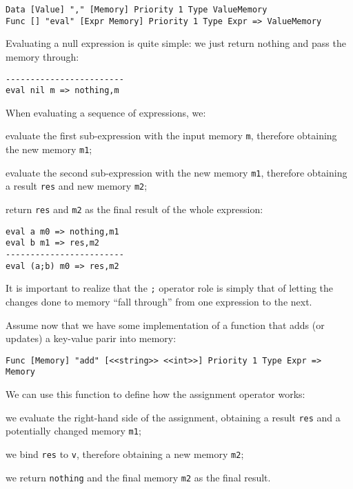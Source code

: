 \begin{lstlisting}
Data [Value] "," [Memory] Priority 1 Type ValueMemory
Func [] "eval" [Expr Memory] Priority 1 Type Expr => ValueMemory
\end{lstlisting}

Evaluating a null expression is quite simple: we just return nothing and pass the memory through:

\begin{lstlisting}
------------------------
eval nil m => nothing,m
\end{lstlisting}

When evaluating a sequence of expressions, we:
\begin{inparaenum}
\item evaluate the first sub-expression with the input memory \texttt{m}, therefore obtaining the new memory \texttt{m1};
\item evaluate the second sub-expression with the new memory \texttt{m1}, therefore obtaining a result \texttt{res} and new memory \texttt{m2};
\item return \texttt{res} and \texttt{m2} as the final result of the whole expression:
\end{inparaenum}

\begin{lstlisting}
eval a m0 => nothing,m1
eval b m1 => res,m2
------------------------
eval (a;b) m0 => res,m2
\end{lstlisting}

It is important to realize that the \texttt{;} operator role is simply that of letting the changes done to memory ``fall through'' from one expression to the next.

Assume now that we have some implementation of a function that adds (or updates) a key-value parir into memory:

\begin{lstlisting}
Func [Memory] "add" [<<string>> <<int>>] Priority 1 Type Expr => Memory
\end{lstlisting}

We can use this function to define how the assignment operator works:
\begin{inparaenum}
\item we evaluate the right-hand side of the assignment, obtaining a result \texttt{res} and a potentially changed memory \texttt{m1};
\item we bind \texttt{res} to \texttt{v}, therefore obtaining a new memory \texttt{m2};
\item we return \texttt{nothing} and the final memory \texttt{m2} as the final result.
\end{inparaenum}

